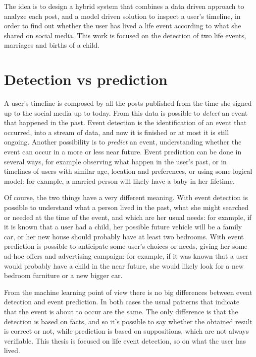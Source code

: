 The idea is to design a hybrid system that combines a data driven approach to analyze each post, and a model driven solution to inspect a user's timeline, in order to find out whether the user has lived a life event according to what she shared on social media. This work is focused on the detection of two life events, marriages and births of a child.

\section{Detection vs prediction}

A user's timeline is composed by all the posts published from the time she signed up to the social media up to today. From this data is possible to \emph{detect} an event that happened in the past. Event detection is the identification of an event that occurred, into a stream of data, and now it is finished or at most it is still ongoing. Another possibility is to \emph{predict} an event, understanding whether the event can occur in a more or less near future. Event prediction can be done in several ways, for example observing what happen in the user's past, or in timelines of users with similar age, location and preferences, or using some logical model: for example, a married person will likely have a baby in her lifetime.

Of course, the two things have a very different meaning. With event detection is possible to understand what a person lived in the past, what she might searched or needed at the time of the event, and which are her usual needs: for example, if it is known that a user had a child, her possible future vehicle will be a family car, or her new house should probably have at least two bedrooms. With event prediction is possible to anticipate some user's choices or needs, giving her some ad-hoc offers and advertising campaign: for example, if it was known that a user would probably have a child in the near future, she would likely look for a new bedroom furniture or a new bigger car.

From the machine learning point of view there is no big differences between event detection and event prediction. In both cases the usual patterns that indicate that the event is about to occur are the same. The only difference is that the detection is based on facts, and so it's possible to say whether the obtained result is correct or not, while prediction is based on suppositions, which are not always verifiable. This thesis is focused on life event detection, so on what the user has lived.

